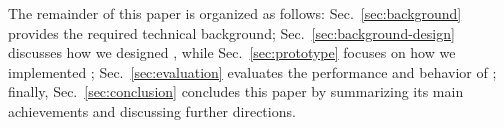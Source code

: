 The remainder of this paper is organized as follows: Sec.~\ref{sec:background} provides the required technical background; Sec.~\ref{sec:background-design} discusses how we designed \tcpls, while Sec.~\ref{sec:prototype} focuses on how we implemented \tcpls; Sec.~\ref{sec:evaluation} evaluates the performance and behavior of \tcpls;  finally, Sec.~\ref{sec:conclusion} concludes this paper by summarizing its main achievements and discussing further directions.





